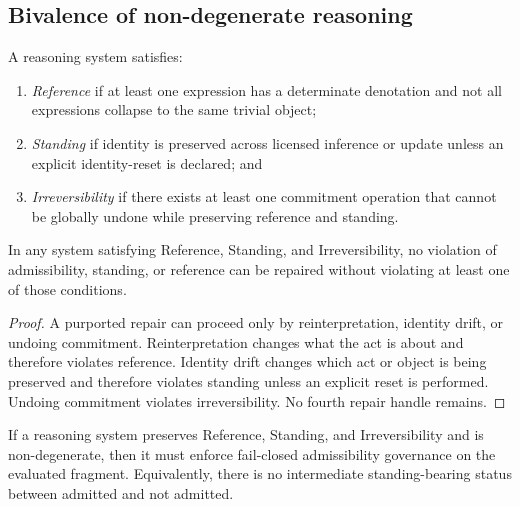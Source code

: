\subsection{Bivalence of non-degenerate reasoning}

\begin{definition}
A reasoning system satisfies:
\begin{enumerate}
  \item \emph{Reference} if at least one expression has a determinate denotation and not all expressions collapse to the same trivial object;
  \item \emph{Standing} if identity is preserved across licensed inference or update unless an explicit identity-reset is declared; and
  \item \emph{Irreversibility} if there exists at least one commitment operation that cannot be globally undone while preserving reference and standing.
\end{enumerate}
\end{definition}

\begin{lemma}
\label{lem:no-standing-preserving-repair}
In any system satisfying Reference, Standing, and Irreversibility, no violation of admissibility, standing, or reference can be repaired without violating at least one of those conditions.
\end{lemma}

\begin{proof}
A purported repair can proceed only by reinterpretation, identity drift, or undoing commitment. Reinterpretation changes what the act is about and therefore violates reference. Identity drift changes which act or object is being preserved and therefore violates standing unless an explicit reset is performed. Undoing commitment violates irreversibility. No fourth repair handle remains.\cite{MaleyAMetric}
\end{proof}

\begin{theorem}
\label{thm:bivalence-nondegenerate-reasoning}
If a reasoning system preserves Reference, Standing, and Irreversibility and is non-degenerate, then it must enforce fail-closed admissibility governance on the evaluated fragment. Equivalently, there is no intermediate standing-bearing status between admitted and not admitted.
\end{theorem}

